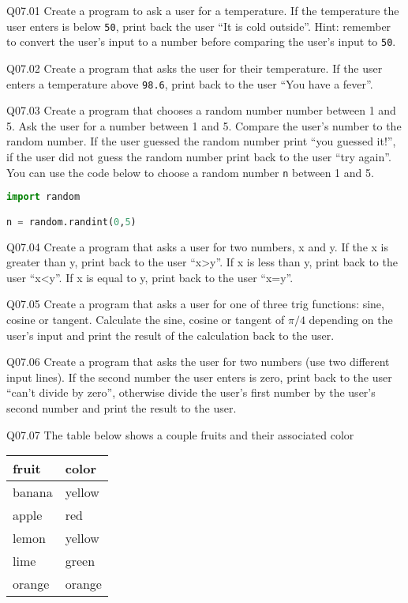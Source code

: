 \documentclass{book}
\newenvironment{problems}{}{}  %
\newcommand{\passthrough}[1]{#1}
\begin{document}
    
        \begin{problems}
        Q07.01 Create a program to ask a user for a temperature. If the
temperature the user enters is below \passthrough{\lstinline!50!}, print
back the user ``It is cold outside''. Hint: remember to convert the
user's input to a number before comparing the user's input to
\passthrough{\lstinline!50!}.

Q07.02 Create a program that asks the user for their temperature. If the
user enters a temperature above \passthrough{\lstinline!98.6!}, print
back to the user ``You have a fever''.

Q07.03 Create a program that chooses a random number number between 1
and 5. Ask the user for a number between 1 and 5. Compare the user's
number to the random number. If the user guessed the random number print
``you guessed it!'', if the user did not guess the random number print
back to the user ``try again''. You can use the code below to choose a
random number \passthrough{\lstinline!n!} between 1 and 5.

\begin{lstlisting}[language=Python]
import random

n = random.randint(0,5)
\end{lstlisting}

Q07.04 Create a program that asks a user for two numbers, x and y. If
the x is greater than y, print back to the user ``x\textgreater{}y''. If
x is less than y, print back to the user ``x\textless{}y''. If x is
equal to y, print back to the user ``x=y''.

Q07.05 Create a program that asks a user for one of three trig
functions: sine, cosine or tangent. Calculate the sine, cosine or
tangent of \(\pi/4\) depending on the user's input and print the result
of the calculation back to the user.

Q07.06 Create a program that asks the user for two numbers (use two
different input lines). If the second number the user enters is zero,
print back to the user ``can't divide by zero'', otherwise divide the
user's first number by the user's second number and print the result to
the user.

Q07.07 The table below shows a couple fruits and their associated color

\begin{longtable}[]{@{}ll@{}}
\toprule
fruit & color\tabularnewline
\midrule
\endhead
banana & yellow\tabularnewline
apple & red\tabularnewline
lemon & yellow\tabularnewline
lime & green\tabularnewline
orange & orange\tabularnewline
\bottomrule
\end{longtable}


\end{problems}
\end{document}
